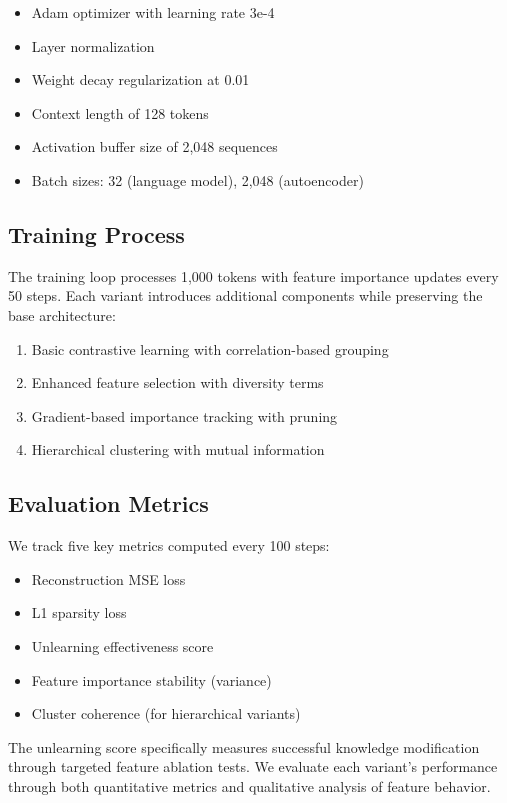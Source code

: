 \documentclass{article} %
\begin{document}
\begin{itemize}
    \item Adam optimizer \cite{kingma2014adam} with learning rate 3e-4
    \item Layer normalization \cite{ba2016layer}
    \item Weight decay regularization \cite{loshchilov2017adamw} at 0.01
    \item Context length of 128 tokens
    \item Activation buffer size of 2,048 sequences
    \item Batch sizes: 32 (language model), 2,048 (autoencoder)
\end{itemize}

\subsection{Training Process}
The training loop processes 1,000 tokens with feature importance updates every 50 steps. Each variant introduces additional components while preserving the base architecture:

\begin{enumerate}
    \item Basic contrastive learning with correlation-based grouping
    \item Enhanced feature selection with diversity terms
    \item Gradient-based importance tracking with pruning
    \item Hierarchical clustering with mutual information
\end{enumerate}

\subsection{Evaluation Metrics}
We track five key metrics computed every 100 steps:

\begin{itemize}
    \item Reconstruction MSE loss
    \item L1 sparsity loss
    \item Unlearning effectiveness score
    \item Feature importance stability (variance)
    \item Cluster coherence (for hierarchical variants)
\end{itemize}

The unlearning score specifically measures successful knowledge modification through targeted feature ablation tests. We evaluate each variant's performance through both quantitative metrics and qualitative analysis of feature behavior.
\end{document}
